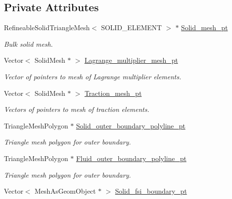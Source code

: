 \subsection*{Private Attributes}
\begin{DoxyCompactItemize}
\item 
Refineable\+Solid\+Triangle\+Mesh$<$ S\+O\+L\+I\+D\+\_\+\+E\+L\+E\+M\+E\+NT $>$ $\ast$ \hyperlink{classUnstructuredFSIProblem_a37c1850e8750ce80c8323438e99c1059}{Solid\+\_\+mesh\+\_\+pt}
\begin{DoxyCompactList}\small\item\em Bulk solid mesh. \end{DoxyCompactList}\item 
Vector$<$ Solid\+Mesh $\ast$ $>$ \hyperlink{classUnstructuredFSIProblem_a2e942a90cc462bf0df04ad28057d4071}{Lagrange\+\_\+multiplier\+\_\+mesh\+\_\+pt}
\begin{DoxyCompactList}\small\item\em Vector of pointers to mesh of Lagrange multiplier elements. \end{DoxyCompactList}\item 
Vector$<$ Solid\+Mesh $\ast$ $>$ \hyperlink{classUnstructuredFSIProblem_ab722df0380d0c045f093472173340fa1}{Traction\+\_\+mesh\+\_\+pt}
\begin{DoxyCompactList}\small\item\em Vectors of pointers to mesh of traction elements. \end{DoxyCompactList}\item 
Triangle\+Mesh\+Polygon $\ast$ \hyperlink{classUnstructuredFSIProblem_afae1de4c7e087e2ba4f60f4f7632674b}{Solid\+\_\+outer\+\_\+boundary\+\_\+polyline\+\_\+pt}
\begin{DoxyCompactList}\small\item\em Triangle mesh polygon for outer boundary. \end{DoxyCompactList}\item 
Triangle\+Mesh\+Polygon $\ast$ \hyperlink{classUnstructuredFSIProblem_adbe081be33298732323b23d89f23f29f}{Fluid\+\_\+outer\+\_\+boundary\+\_\+polyline\+\_\+pt}
\begin{DoxyCompactList}\small\item\em Triangle mesh polygon for outer boundary. \end{DoxyCompactList}\item 
Vector$<$ Mesh\+As\+Geom\+Object $\ast$ $>$ \hyperlink{classUnstructuredFSIProblem_a292fef90d668209e31d51db20d6bfd9a}{Solid\+\_\+fsi\+\_\+boundary\+\_\+pt}
\end{DoxyCompactItemize}


